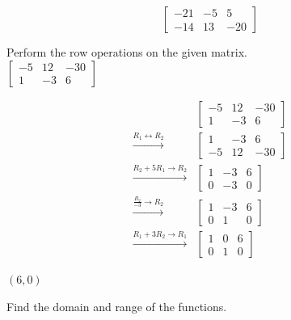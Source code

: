 \documentclass[addpoints]{exam}
\begin{document}
\begin{questions}
\begin{solution}
\[\boxed{ \left[\begin{array}{cc|c} -21 & -5 & 5 \\ -14 & 13 & -20 \end{array}\right] }\]
\end{solution}

\question[6] Perform the row operations on the given matrix.\\
    
\(\displaystyle{ \left[\begin{array}{cc|c} -5 & 12 & -30 \\ 1 & -3 & 6 \end{array}\right] }\)
\begin{solution}
\[\begin{aligned} & \left[\begin{array}{cc|c} -5 & 12 & -30 \\ 1 & -3 & 6 \end{array}\right] \\ \xrightarrow{R_1 \leftrightarrow R_2} & \left[\begin{array}{cc|c} 1 & -3 & 6 \\ -5 & 12 & -30 \end{array}\right] \\ \xrightarrow{R_2 + 5R_1 \to R_2} & \left[\begin{array}{cc|c} 1 & -3 & 6 \\ 0 & -3 & 0 \end{array}\right] \\ \xrightarrow{\frac{R_2}{-3} \to R_2} & \left[\begin{array}{cc|c} 1 & -3 & 6 \\ 0 & 1 & 0 \end{array}\right] \\ \xrightarrow{R_1 + 3R_2 \to R_1} & \left[\begin{array}{cc|c} 1 & 0 & 6 \\ 0 & 1 & 0 \end{array}\right] \end{aligned}\]

\(\boxed{ (6, 0) }\)
\end{solution}
\answerline
\newpage

\question Find the domain and range of the functions.
\end{questions}
\end{document}
